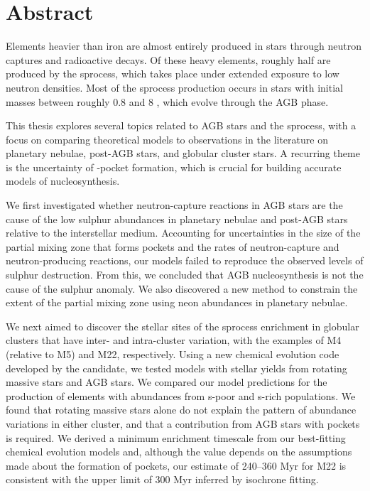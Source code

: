 \section*{Abstract}

Elements heavier than iron are almost entirely produced in stars through neutron captures and radioactive decays. Of these heavy elements, roughly half are produced by the \gls{sprocess}, which takes place under extended exposure to low neutron densities. Most of the \gls{sprocess} production occurs in stars with initial masses between roughly 0.8 and 8 \Msun, which evolve through the \gls{AGB} phase.

This thesis explores several topics related to \gls{AGB} stars and the \gls{sprocess}, with a focus on comparing theoretical models to observations in the literature on planetary nebulae, post-AGB stars, and globular cluster stars. A recurring theme is the uncertainty of -pocket formation, which is crucial for building accurate models of \sprocess nucleosynthesis.

We first investigated whether neutron-capture reactions in \gls{AGB} stars are the cause of the low sulphur abundances in planetary nebulae and post-AGB stars relative to the interstellar medium. Accounting for uncertainties in the size of the partial mixing zone that forms  pockets and the rates of neutron-capture and neutron-producing reactions, our models failed to reproduce the observed levels of sulphur destruction. From this, we concluded that \gls{AGB} nucleosynthesis is not the cause of the sulphur anomaly. We also discovered a new method to constrain the extent of the partial mixing zone using neon abundances in planetary nebulae.

We next aimed to discover the stellar sites of the \gls{sprocess} enrichment in globular clusters that have inter- and intra-cluster variation, with the examples of M4 (relative to M5) and M22, respectively. Using a new chemical evolution code developed by the candidate, we tested models with stellar yields from rotating massive stars and \gls{AGB} stars. We compared our model predictions for the production of \sprocess elements with abundances from s-poor and s-rich populations. We found that rotating massive stars alone do not explain the pattern of abundance variations in either cluster, and that a contribution from \gls{AGB} stars with  pockets is required. We derived a minimum enrichment timescale from our best-fitting chemical evolution models and, although the value depends on the assumptions made about the formation of  pockets, our estimate of 240--360 Myr for M22 is consistent with the upper limit of 300 Myr inferred by isochrone fitting.

